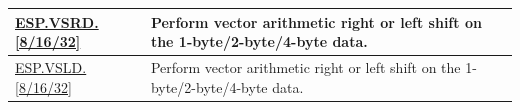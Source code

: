 \begin{longtable}[c]{|l|m{11cm}|}
       \hyperref[instruction:ESPVSrd32]{ESP.VSRD.[8/16/32]} & Perform vector arithmetic right or left shift on the 1-byte/2-byte/4-byte data.
    \\\hline

           \hyperref[instruction:ESPVSLD32]{ESP.VSLD.[8/16/32]} & Perform vector arithmetic right or left shift on the 1-byte/2-byte/4-byte data.
    \\\hline
    
\end{longtable}
